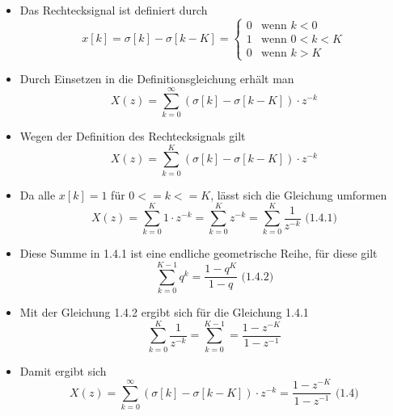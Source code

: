 \documentclass[11pt]{article}
\providecommand{\tightlist}{%
      \setlength{\itemsep}{0pt}\setlength{\parskip}{0pt}}
\def\gt{>}
\def\lt{<}
\begin{document}
\begin{itemize}
\tightlist
\item
  Das Rechtecksignal ist definiert durch\\
  \[
  \displaystyle x[k] = \sigma[k] - \sigma[k-K] = \begin{cases}
   0 & \text{wenn $k \lt 0$} \\
   1 & \text{wenn $0 \lt k \lt K$} \\ 
   0 & \text{wenn $k \gt K$}
  \end{cases}
  \]
\end{itemize}

    \begin{itemize}
\tightlist
\item
  Durch Einsetzen in die Definitionsgleichung erhält man
  \[X(z) = \sum_{k=0}^\infty (\sigma[k] - \sigma[k-K]) \cdot z^{-k}\]
\end{itemize}

    \begin{itemize}
\tightlist
\item
  Wegen der Definition des Rechtecksignals gilt
  \[X(z) = \sum_{k=0}^K (\sigma[k] - \sigma[k-K]) \cdot z^{-k}\]
\end{itemize}

    \begin{itemize}
\tightlist
\item
  Da alle \(x[k] = 1\) für \(0 <= k <= K\), lässt sich die Gleichung
  umformen
  \[X(z) = \sum_{k=0}^K 1 \cdot z^{-k} = \sum_{k=0}^K z^{-k} = \sum_{k=0}^K \frac{1}{z^{-k}}\textrm{  (1.4.1)}\]
\end{itemize}

    \begin{itemize}
\tightlist
\item
  Diese Summe in 1.4.1 ist eine endliche geometrische Reihe, für diese
  gilt \[\sum_{k=0}^{K-1} q^k = \frac{1-q^K}{1-q}\textrm{  (1.4.2)}\]
\end{itemize}

    \begin{itemize}
\tightlist
\item
  Mit der Gleichung 1.4.2 ergibt sich für die Gleichung 1.4.1
  \[\sum_{k=0}^K \frac{1}{z^{-k}} = \sum_{k=0}^{K-1} = \frac{1-z^{-K}}{1-z^{-1}}\]
\end{itemize}

    \begin{itemize}
\tightlist
\item
  Damit ergibt sich
  \[X(z) = \sum_{k=0}^\infty (\sigma[k] - \sigma[k-K]) \cdot z^{-k} = \frac{1-z^{-K}}{1-z^{-1}} \textrm{  (1.4)}\]
\end{itemize}
\end{document}
